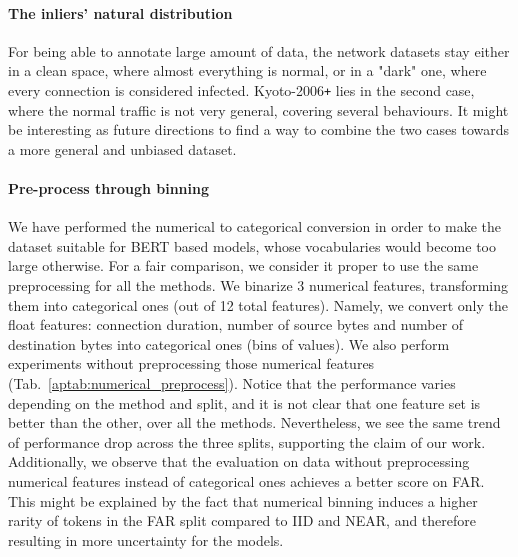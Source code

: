 \documentclass{article}
\begin{document}
\paragraph{The inliers' natural distribution} For being able to annotate large amount of data, the network datasets stay either in a clean space, where almost everything is normal, or in a "dark" one, where every connection is considered infected. Kyoto-2006\texttt{+} lies in the second case, where the normal traffic is not very general, covering several behaviours. It might be interesting as future directions to find a way to combine the two cases towards a more general and unbiased dataset.

\paragraph{Pre-process through binning} We have performed the numerical to categorical conversion in order to make the dataset suitable for BERT based models, whose vocabularies would become too large otherwise. For a fair comparison, we consider it proper to use the same preprocessing for all the methods. We binarize 3 numerical features, transforming them into categorical ones (out of 12 total features). Namely, we convert only the float features: connection duration, number of source bytes and number of destination bytes into categorical ones (bins of values). We also perform experiments without preprocessing those numerical features (Tab.~\ref{aptab:numerical_preprocess}). Notice that the performance varies depending on the method and split, and it is not clear that one feature set is better than the other, over all the methods. Nevertheless, we see the same trend of performance drop across the three splits, supporting the claim of our work. Additionally, we observe that the evaluation on data without preprocessing numerical features instead of categorical ones achieves a better score on FAR. This might be explained by the fact that numerical binning induces a higher rarity of tokens in the FAR split compared to IID and NEAR, and therefore resulting in more uncertainty for the models.
\end{document}
